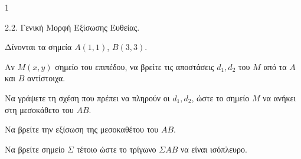 \begin{ylh}{1}
    \item 2.2. Γενική Μορφή Εξίσωσης Ευθείας.
\end{ylh}
Δίνονται τα σημεία $A(1,1)$, $B(3,3)$.
\begin{alist}
\item Αν $M(x,y)$ σημείο του επιπέδου, να βρείτε τις αποστάσεις $d_1, d_2$ του $M$ από τα $A$ και $B$ αντίστοιχα. 
\item Να γράψετε τη σχέση που πρέπει να πληρούν οι $d_1, d_2$, ώστε το σημείο $M$ να ανήκει στη μεσοκάθετο του $AB$. 
\item Να βρείτε την εξίσωση της μεσοκαθέτου του $AB$. 
\item Να βρείτε σημείο $Σ$ τέτοιο ώστε το τρίγωνο $ΣAB$ να είναι ισόπλευρο. 
\end{alist}